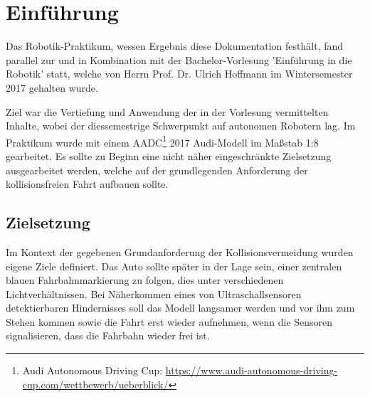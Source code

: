 \documentclass[12pt, a4paper]{scrartcl}
\begin{document}

\newpage
\tableofcontents %
\newpage



\section{Einführung}

Das Robotik-Praktikum, wessen Ergebnis diese Dokumentation festhält, fand parallel zur und in Kombination mit der Bachelor-Vorlesung 'Einführung in die Robotik' statt, welche von Herrn Prof. Dr. Ulrich Hoffmann im Wintersemester 2017 gehalten wurde.

Ziel war die Vertiefung und Anwendung der in der Vorlesung vermittelten Inhalte, wobei der diessemestrige Schwerpunkt  auf autonomen Robotern lag. Im Praktikum wurde mit einem AADC\footnote{Audi Autonomous Driving Cup: \url{https://www.audi-autonomous-driving-cup.com/wettbewerb/ueberblick/}} 2017 Audi-Modell im Maßstab 1:8 gearbeitet. Es sollte zu Beginn eine nicht näher eingeschränkte Zielsetzung ausgearbeitet werden, welche auf der grundlegenden Anforderung der kollisionsfreien Fahrt aufbauen sollte.

\subsection{Zielsetzung}

Im Kontext der gegebenen Grundanforderung der Kollisionsvermeidung wurden eigene Ziele definiert. Das Auto sollte später in der Lage sein, einer zentralen blauen Fahrbahnmarkierung zu folgen, dies unter verschiedenen Lichtverhältnissen. Bei Näherkommen eines von Ultraschallsensoren detektierbaren Hindernisses soll das Modell langsamer werden und vor ihm zum Stehen kommen sowie die Fahrt erst wieder aufnehmen, wenn die Sensoren signalisieren, dass die Fahrbahn wieder frei ist.
\end{document}
